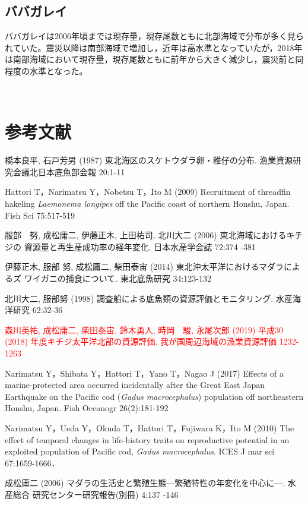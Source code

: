 \documentclass[11pt]{article} %
\begin{document}
\begin{linenumbers}
\subsection{ババガレイ}
ババガレイは2006年頃までは現存量，現存尾数ともに北部海域で分布が多く見られていた。震災以降は南部海域で増加し，近年は高水準となっていたが，2018年は南部海域において現存量，現存尾数ともに前年から大きく減少し，震災前と同程度の水準となった。

\ \ \ \ \ \ \ \ \ \ 
\section{参考文献}
\hangindent=30pt
\noindent
橋本良平, 石戸芳男 (1987) 東北海区のスケトウダラ卵・稚仔の分布. 漁業資源研究会議北日本底魚部会報 20:1-11

\noindent
Hattori T，Narimatsu Y，Nobetsu T，Ito M (2009) Recruitment of threadfin hakeling \textit{Laemonema longipes} off the Pacific coast of northern Honshu, Japan. Fish Sci 75:517-519

\noindent
服部　努, 成松庸二, 伊藤正木, 上田祐司, 北川大二 (2006) 東北海域におけるキチジの
資源量と再生産成功率の経年変化. 日本水産学会誌 72:374 -381

\noindent
伊藤正木, 服部 努, 成松庸二, 柴田泰宙 (2014) 東北沖太平洋におけるマダラによるズ
ワイガニの捕食について. 東北底魚研究 34:123-132

\noindent
北川大二, 服部努 (1998) 調査船による底魚類の資源評価とモニタリング. 水産海洋研究 62:32-36

\noindent
\textcolor{red}{森川英祐, 成松庸二, 柴田泰宙, 鈴木勇人, 時岡　駿, 永尾次郎 (2019) 平成30 (2018) 年度キチジ太平洋北部の資源評価. 我が国周辺海域の漁業資源評価 1232-1263}

\noindent
Narimatsu Y，Shibata Y，Hattori T，Yano T，Nagao J (2017) Effects of a marine-protected area occurred incidentally after the Great East Japan Earthquake on the Pacific cod (\textit{Gadus macrocephalus}) population off northeastern Honshu, Japan. Fish Oceanogr 26(2):181-192

\noindent
Narimatsu Y，Ueda Y，Okuda T，Hattori T，Fujiwara K，Ito M (2010) The effect of temporal changes in life-history traits on reproductive potential in an exploited population of Pacific cod, \textit{Gadus macrocephalus}. ICES J mar sci 67:1659-1666．

\noindent
成松庸二 (2006) マダラの生活史と繁殖生態―繁殖特性の年変化を中心に―. 水産総合
研究センター研究報告(別冊) 4:137 -146


\end{linenumbers}
\end{document}

